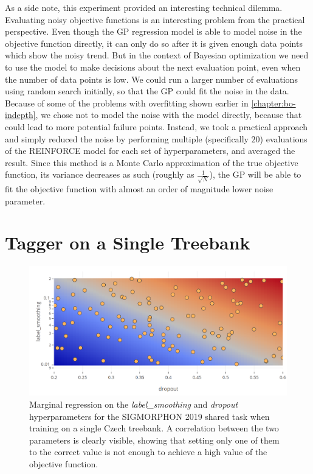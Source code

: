 As a side note, this experiment provided an interesting technical dilemma. Evaluating noisy objective functions is an interesting problem from the practical perspective. Even though the GP regression model is able to model noise in the objective function directly, it can only do so after it is given enough data points which show the noisy trend. But in the context of Bayesian optimization we need to use the model to make decisions about the next evaluation point, even when the number of data points is low. We could run a larger number of evaluations using random search initially, so that the GP could fit the noise in the data. Because of some of the problems with overfitting shown earlier in \autoref{chapter:bo-indepth}, we chose not to model the noise with the model directly, because that could lead to more potential failure points. Instead, we took a practical approach and simply reduced the noise by performing multiple (specifically $20$) evaluations of the REINFORCE model for each set of hyperparameters, and averaged the result. Since this method is a Monte Carlo approximation of the true objective function, its variance decreases as such (roughly as $\frac{1}{\sqrt{N}}$), the GP will be able to fit the objective function with almost an order of magnitude lower noise parameter.


\section{Tagger on a Single Treebank}
\label{section:exp-cestina}

\begin{figure}
	\begin{center}
		\includegraphics[width=1.0\textwidth]{images/czech-2d-marginal.png}
		\caption{Marginal regression on the \emph{label\_smoothing} and \emph{dropout} hyperparameters for the SIGMORPHON 2019 shared task when training on a single Czech treebank. A correlation between the two parameters is clearly visible, showing that setting only one of them to the correct value is not enough to achieve a high value of the objective function.}
		\label{figure:czech-2d-marginal}
	\end{center}
\end{figure}

